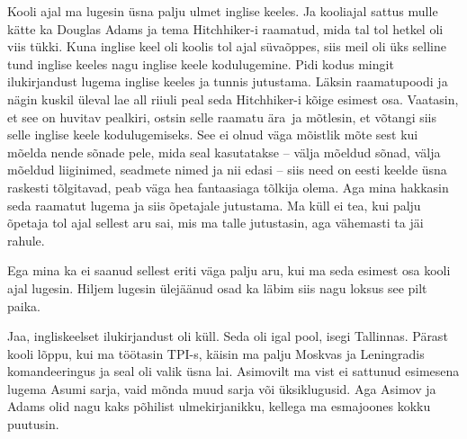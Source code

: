 Kooli ajal ma lugesin üsna palju ulmet inglise keeles. Ja kooliajal sattus 
mulle kätte ka Douglas Adams ja tema Hitchhiker-i raamatud, mida tal tol hetkel oli viis 
tükki. Kuna inglise keel oli koolis tol ajal süvaõppes, siis meil oli üks 
selline tund inglise keeles nagu inglise keele kodulugemine. Pidi kodus mingit 
ilukirjandust lugema inglise keeles ja tunnis  jutustama. Läksin raamatupoodi 
ja nägin kuskil üleval lae all riiuli peal seda Hitchhiker-i kõige esimest osa. 
Vaatasin, et see on huvitav pealkiri, ostsin selle raamatu ära ja mõtlesin, et 
võtangi siis selle inglise keele kodulugemiseks. See ei olnud väga mõistlik 
mõte sest kui mõelda nende sõnade pele, mida seal kasutatakse -- välja mõeldud 
sõnad, välja mõeldud liiginimed, seadmete nimed ja nii edasi -- siis need on 
eesti keelde üsna raskesti tõlgitavad,  peab väga hea fantaasiaga tõlkija 
olema. Aga mina hakkasin seda raamatut lugema ja siis õpetajale jutustama. Ma 
küll ei tea, kui palju õpetaja tol ajal sellest aru sai, mis ma talle 
jutustasin, aga vähemasti ta jäi rahule. 


Ega mina ka ei saanud  sellest eriti väga palju aru, kui ma seda esimest osa 
kooli ajal lugesin. Hiljem lugesin  ülejäänud osad ka läbim siis nagu loksus 
see pilt paika.


Jaa, ingliskeelset ilukirjandust oli küll. Seda oli igal pool, isegi Tallinnas. 
Pärast kooli lõppu, kui ma töötasin TPI-s, 
käisin ma palju Moskvas ja Leningradis komandeeringus ja seal oli valik üsna 
lai. Asimovilt ma vist ei sattunud esimesena lugema Asumi sarja, vaid mõnda muud sarja või 
üksiklugusid. Aga Asimov ja Adams olid nagu kaks põhilist ulmekirjanikku, 
kellega ma esmajoones kokku puutusin. 


